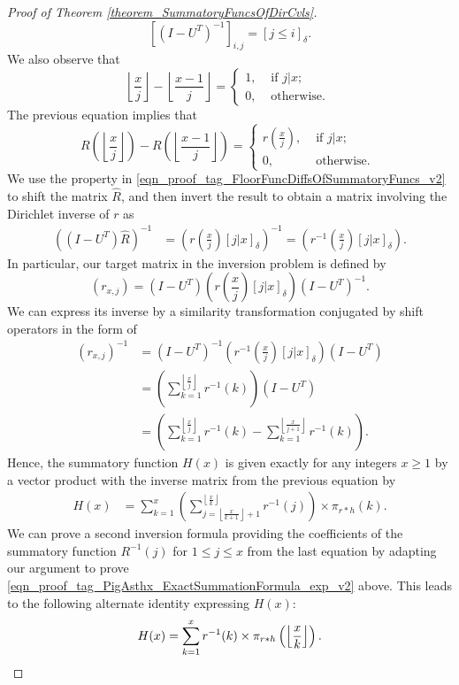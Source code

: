 \documentclass[11pt,reqno,a4letter]{article}
\numberwithin{figure}{section}
\numberwithin{table}{section}
\newcommand{\Iverson}[1]{\ensuremath{\left[#1\right]_{\delta}}}
\newcommand{\floor}[1]{\left\lfloor #1 \right\rfloor}
\newcommand{\Floor}[2]{\ensuremath{\left\lfloor \frac{#1}{#2} \right\rfloor}}
\theoremstyle{plain}
\numberwithin{theorem}{section}
\theoremstyle{definition}
\begin{document}
\begin{proof}[Proof of Theorem \ref{theorem_SummatoryFuncsOfDirCvls}]
\[
\left[(I - U^T)^{-1}\right]_{i,j} = \Iverson{j \leq i}. 
\]
We also observe that 
\[
\Floor{x}{j} - \Floor{x-1}{j} = \begin{cases} 
     1, & \text{ if $j|x$; } \\ 
     0, & \text{ otherwise. } 
     \end{cases} 
\] 
The previous equation implies that 
\begin{equation} 
\label{eqn_proof_tag_FloorFuncDiffsOfSummatoryFuncs_v2} 
R\left(\floor{\frac{x}{j}}\right) - R\left(\floor{\frac{x-1}{j}}\right) = 
     \begin{cases} 
     r\left(\frac{x}{j}\right), & \text{ if $j | x$; } \\ 
     0, & \text{ otherwise. } 
     \end{cases}
\end{equation} 
We use the property in \eqref{eqn_proof_tag_FloorFuncDiffsOfSummatoryFuncs_v2} 
to shift the matrix $\hat{R}$, and then invert the result to obtain a matrix involving the 
Dirichlet inverse of $r$ as 
\begin{align*} 
\left(\left(I-U^{T}\right) \hat{R}\right)^{-1} & = 
     \left(r\left(\frac{x}{j}\right) \Iverson{j|x}\right)^{-1} = 
     \left(r^{-1}\left(\frac{x}{j}\right) \Iverson{j|x}\right). 
\end{align*} 
In particular, our target matrix in the inversion problem is defined by 
$$(r_{x,j}) = \left(I-U^{T}\right) \left(r\left(\frac{x}{j}\right) \Iverson{j|x}\right) \left(I-U^{T}\right)^{-1}.$$
We can express its inverse by a similarity transformation conjugated by shift operators in the form of 
\begin{align*} 
(r_{x,j})^{-1} & = \left(I-U^{T}\right)^{-1} \left(r^{-1}\left(\frac{x}{j}\right) 
     \Iverson{j|x}\right) \left(I-U^{T}\right) \\ 
     & = \left(\sum_{k=1}^{\floor{\frac{x}{j}}} r^{-1}(k)\right) (I-U^{T}) \\ 
     & = \left(\sum_{k=1}^{\floor{\frac{x}{j}}} r^{-1}(k) - \sum_{k=1}^{\floor{\frac{x}{j+1}}} r^{-1}(k)\right). 
\end{align*} 
Hence, the summatory function $H(x)$ is given exactly for any integers $x \geq 1$ 
by a vector product with the inverse matrix from the previous equation by 
\begin{align*} 
H(x) & = \sum_{k=1}^x \left(\sum_{j=\floor{\frac{x}{k+1}}+1}^{\floor{\frac{x}{k}}} r^{-1}(j)\right) 
     \times \pi_{r \ast h}(k). 
\end{align*} 
We can prove a second inversion formula providing the coefficients of the summatory function 
$R^{-1}(j)$ for $1 \leq j \leq x$ from the last equation by adapting our argument to prove 
\eqref{eqn_proof_tag_PigAsthx_ExactSummationFormula_exp_v2} above. 
This leads to the following alternate identity expressing $H(x)$: 
\[
H(x) = \sum_{k=1}^{x} r^{-1}(k) \times \pi_{r \ast h}\left(\Floor{x}{k}\right). 
     \qedhere 
\]
\end{proof} 
\end{document}
